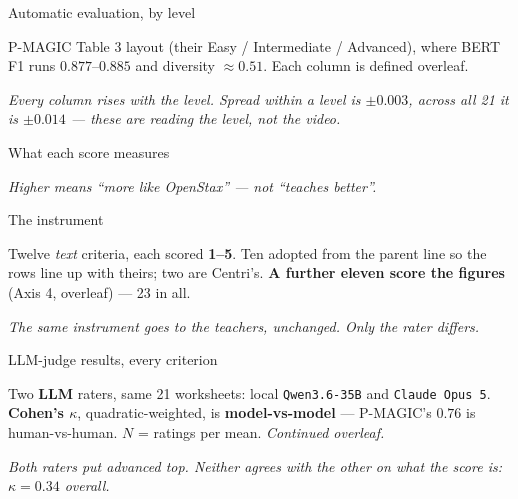 \documentclass[aspectratio=169,10pt]{beamer}
\newcommand{\takeaway}[1]{\vfill{\footnotesize\itshape\color{cGrey}#1\par}}
\begin{document}
\begin{frame}{Automatic evaluation, by level}
\vfill
\begin{center}
\scriptsize
\renewcommand{\arraystretch}{1.15}
\resizebox{\textwidth}{!}{\pmagicAuto}
\end{center}
\vfill
\begin{center}
{\scriptsize P-MAGIC Table 3 layout (their Easy / Intermediate / Advanced), where BERT F1 runs
$0.877$--$0.885$ and diversity $\approx 0.51$. Each column is defined overleaf.}
\end{center}
\takeaway{Every column rises with the level. Spread \emph{within} a level is $\pm 0.003$, across
all 21 it is $\pm 0.014$ --- these are reading the level, not the video.}
\end{frame}

\begin{frame}{What each score measures}
\begin{center}
\scriptsize
\renewcommand{\arraystretch}{1.0}
\pmagicMetricDefs
\end{center}
\takeaway{Higher means ``more like OpenStax'' --- not ``teaches better''.}
\end{frame}

\begin{frame}{The instrument}
\begin{center}
\scriptsize
\renewcommand{\arraystretch}{1.05}
\pmagicCriteria
\end{center}
\begin{center}
{\scriptsize Twelve \emph{text} criteria, each scored \textbf{1--5}. Ten adopted from the parent
line so the rows line up with theirs; two are Centri's. \textbf{A further eleven score the
figures} (Axis 4, overleaf) --- 23 in all.}
\end{center}
\takeaway{The same instrument goes to the teachers, unchanged. Only the rater differs.}
\end{frame}

\begin{frame}{LLM-judge results, every criterion}
\begin{center}
\tiny
\renewcommand{\arraystretch}{0.98}
\pmagicJudge
\end{center}
\begin{center}
{\scriptsize Two \textbf{LLM} raters, same 21 worksheets: local \texttt{Qwen3.6-35B} and
\texttt{Claude Opus 5}. \textbf{Cohen's $\kappa$}, quadratic-weighted, is \textbf{model-vs-model}
--- P-MAGIC's $0.76$ is human-vs-human. $N$ = ratings per mean. \emph{Continued overleaf.}}
\end{center}
\takeaway{Both raters put advanced top. Neither agrees with the other on what the score is:
$\kappa = 0.34$ overall.}
\end{frame}
\end{document}
